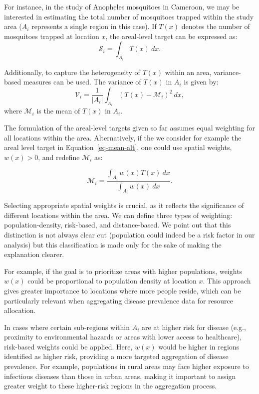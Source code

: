 \documentclass[
  letterpaper,
]{krantz}
\begin{document}
For instance, in the study of Anopheles mosquitoes in Cameroon, we may
be interested in estimating the total number of mosquitoes trapped
within the study area (\(A_i\) represents a single region in this case).
If \(T(x)\) denotes the number of mosquitoes trapped at location \(x\),
the areal-level target can be expressed as: \[
  \mathcal{S}_i = \int_{A_i} T(x) \: dx.
  \]

Additionally, to capture the heterogeneity of \(T(x)\) within an area,
variance-based measures can be used. The variance of \(T(x)\) in \(A_i\)
is given by: \[
   \mathcal{V}_i = \frac{1}{|A_i|}\int_{A_i} \left(T(x) - \mathcal{M}_i\right)^2 \: dx,
   \] where \(\mathcal{M}_i\) is the mean of \(T(x)\) in \(A_i\).

The formulation of the areal-level targets given so far assumes equal
weighting for all locations within the area. Alternatively, if the we
consider for example the areal level target in
Equation~\ref{eq-mean-alt}, one could use spatial weights, \(w(x) > 0\),
and redefine \(\mathcal{M}_i\) as:

\[
\mathcal{M}_i = \frac{\int_{A_i} w(x) T(x) \: dx}{\int_{A_i} w(x) \: dx}.
\]

Selecting appropriate spatial weights is crucial, as it reflects the
significance of different locations within the area. We can define three
types of weighting: population-density, risk-based, and distance-based.
We point out that this distinction is not always clear cut (population
could indeed be a risk factor in our analysis) but this classification
is made only for the sake of making the explanation clearer.

For example, if the goal is to prioritize areas with higher populations,
weights \(w(x)\) could be proportional to population density at location
\(x\). This approach gives greater importance to locations where more
people reside, which can be particularly relevant when aggregating
disease prevalence data for resource allocation.

In cases where certain sub-regions within \(A_i\) are at higher risk for
disease (e.g., proximity to environmental hazards or areas with lower
access to healthcare), risk-based weights could be applied. Here,
\(w(x)\) would be higher in regions identified as higher risk, providing
a more targeted aggregation of disease prevalence. For example,
populations in rural areas may face higher exposure to infectious
diseases than those in urban areas, making it important to assign
greater weight to these higher-risk regions in the aggregation process.
\end{document}
